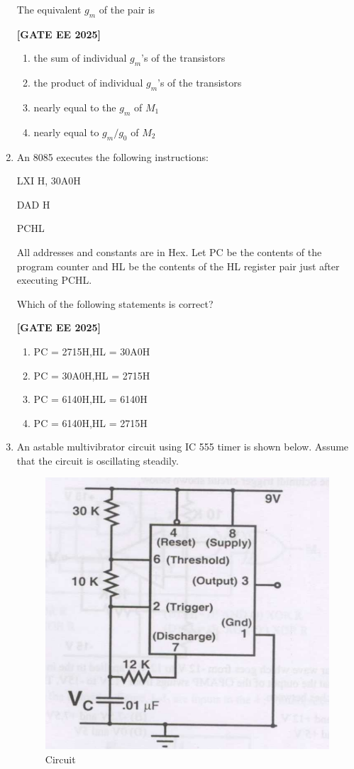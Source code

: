 \documentclass[12pt]{article}
\begin{document}
\begin{enumerate}[leftmargin=*, label=\textbf{Q.\arabic*:}]
The equivalent $g_m$ of the pair is
 
\noindent \textbf{[GATE EE 2025]}
\begin{enumerate}
  \item the sum of individual $g_m$'s of the transistors
  \item the product of individual $g_m$'s of the transistors
  \item nearly equal to the $g_m$ of $M_1$
  \item nearly equal to $g_m/g_{0}$ of $M_2$
\end{enumerate}

\item An 8085 executes the following instructions:

LXI H, 30A0H

DAD H

PCHL

All addresses and constants are in Hex. Let PC be the contents of the program counter and HL be the contents of the HL register pair just after executing PCHL.

Which of the following statements is correct?
 
\noindent \textbf{[GATE EE 2025]}
\begin{enumerate}
  \item PC = 2715H,\quad HL = 30A0H
  \item PC = 30A0H,\quad HL = 2715H
  \item PC = 6140H,\quad HL = 6140H
  \item PC = 6140H,\quad HL = 2715H
\end{enumerate}

\item An astable multivibrator circuit using IC 555 timer is shown below. Assume that the circuit is oscillating steadily.

\begin{figure}[H]\centering
\includegraphics[width=0.7\columnwidth]{figs/q50.png}
\caption{Circuit}
\label{fig:q50}
\end{figure}


\end{enumerate}
\end{document}
